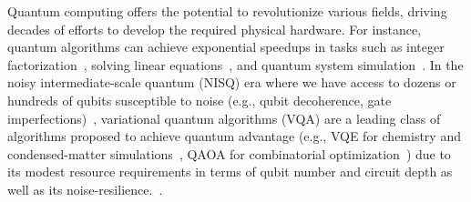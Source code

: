 \documentclass[conference,9pt]{IEEEtran}
\newcommand{\note}[1]{{\color{blue} #1}}
\newcommand{\JC}[1]{{\color{red} [JC: #1]}}
\begin{document}
    Quantum computing offers the potential to revolutionize various fields, driving decades of efforts to develop the required physical hardware. For instance, quantum algorithms can achieve exponential speedups in tasks such as integer factorization~\cite{shor1994algorithms}, solving linear equations~\cite{harrow2009quantum}, and quantum system simulation~\cite{lloyd1996universal}. In the noisy intermediate-scale quantum (NISQ) era where we have access to dozens or hundreds of qubits susceptible to noise (e.g., qubit decoherence, gate imperfections)~\cite{preskill2018quantum}, variational quantum algorithms (VQA) are a leading class of algorithms proposed to achieve quantum advantage (e.g., VQE for chemistry and condensed-matter simulations~\cite{peruzzo2014variational}, QAOA for combinatorial optimization~\cite{farhi2014quantum}) due to its modest resource requirements in terms of qubit number and circuit depth as well as its noise-resilience.~\cite{cerezo2021variational}.


\end{document}
